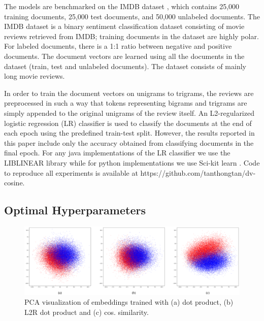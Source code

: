\documentclass[11pt,a4paper]{article}
\begin{document}
The models are benchmarked on the IMDB dataset \cite{maas2011}, which contains 25,000 training documents, 25,000 test documents, and 50,000 unlabeled documents. The IMDB dataset is a binary sentiment classification dataset consisting of movie reviews retrieved from IMDB; training documents in the dataset are highly polar. For labeled documents, there is a 1:1 ratio between negative and positive documents. The document vectors are learned using all the documents in the dataset (train, test and unlabeled documents). The dataset consists of mainly long movie reviews. 

In order to train the document vectors on unigrams to trigrams, the reviews are preprocessed in such a way that tokens representing bigrams and trigrams are simply appended to the original unigrams of the review itself. An L2-regularized logistic regression (LR) classifier is used to classify the documents at the end of each epoch using the predefined train-test split. However, the results reported in this paper
include only the accuracy obtained from classifying documents in the final epoch. For any java implementations of the LR classifier we use the LIBLINEAR library \cite{fan2008} while for python implementations we use Sci-kit learn \cite{pedregosa2011}. Code to reproduce all experiments is available at https://github.com/tanthongtan/dv-cosine. 




\subsection{Optimal Hyperparameters}

\begin{figure}[]
\includegraphics[width=\linewidth]{plot.png}
\caption{PCA visualization of embeddings trained with (a) dot product, (b) L2R dot product and (c) cos. similarity.}
\label{plot}
\end{figure}
\end{document}
